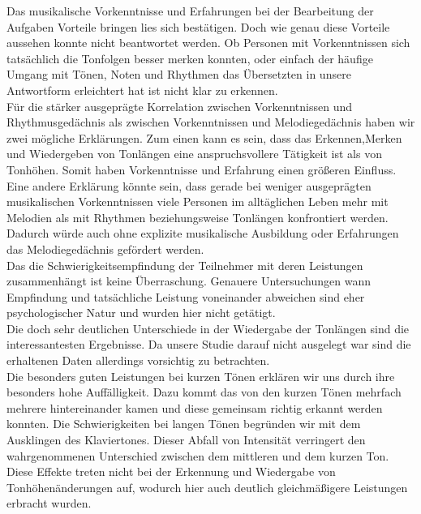 \documentclass{acm_proc_article-sp}
\begin{document}
Das musikalische Vorkenntnisse und Erfahrungen bei der Bearbeitung der Aufgaben Vorteile bringen lies sich bestätigen. Doch wie genau diese Vorteile aussehen konnte nicht beantwortet werden. Ob Personen mit Vorkenntnissen sich tatsächlich die Tonfolgen besser merken konnten, oder einfach der häufige Umgang mit Tönen, Noten und Rhythmen das Übersetzten in unsere Antwortform erleichtert hat ist nicht klar zu erkennen.\\
Für die stärker ausgeprägte Korrelation zwischen Vorkenntnissen und Rhythmusgedächnis als zwischen Vorkenntnissen und Melodiegedächnis haben wir zwei mögliche Erklärungen. Zum einen kann es sein, dass das Erkennen,Merken und Wiedergeben von Tonlängen eine anspruchsvollere Tätigkeit ist als von Tonhöhen. Somit haben Vorkenntnisse und Erfahrung einen größeren Einfluss. \\
Eine andere Erklärung könnte sein, dass gerade bei weniger ausgeprägten musikalischen Vorkenntnissen viele Personen im alltäglichen Leben mehr mit Melodien als mit Rhythmen beziehungsweise Tonlängen konfrontiert werden. Dadurch würde auch ohne explizite musikalische Ausbildung oder Erfahrungen das Melodiegedächnis gefördert werden.\\
Das die Schwierigkeitsempfindung der Teilnehmer mit deren Leistungen zusammenhängt ist keine Überraschung. Genauere Untersuchungen wann Empfindung und tatsächliche Leistung voneinander abweichen sind eher psychologischer Natur und wurden hier nicht getätigt.\\

Die doch sehr deutlichen Unterschiede in der Wiedergabe der Tonlängen sind die interessantesten Ergebnisse. Da unsere Studie darauf nicht ausgelegt war sind die erhaltenen Daten allerdings vorsichtig zu betrachten. \\
Die besonders guten Leistungen bei kurzen Tönen erklären wir uns durch ihre besonders hohe Auffälligkeit. Dazu kommt das von den kurzen Tönen mehrfach mehrere hintereinander kamen und diese gemeinsam richtig erkannt werden konnten. Die Schwierigkeiten bei langen Tönen begründen wir mit dem Ausklingen des Klaviertones. Dieser Abfall von Intensität verringert den wahrgenommenen Unterschied zwischen dem mittleren und dem kurzen Ton.
Diese Effekte treten nicht bei der Erkennung und Wiedergabe von Tonhöhenänderungen auf, wodurch hier auch deutlich gleichmäßigere Leistungen erbracht wurden.
\end{document}
